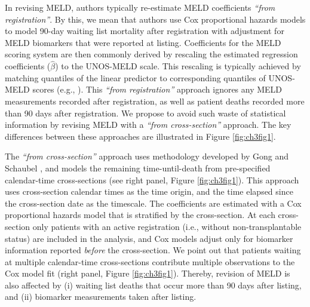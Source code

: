\documentclass[11pt,twoside,]{book}
\begin{document}
In revising MELD, authors typically re-estimate MELD coefficients \emph{``from
registration''}. By this, we mean that authors use Cox proportional hazards models
to model 90-day waiting list mortality after registration with adjustment
for MELD biomarkers that were reported at listing. Coefficients for the MELD scoring system are then commonly derived by rescaling the estimated regression coefficients (\(\widehat{\beta}\)) to the UNOS-MELD scale. This rescaling is typically achieved by matching quantiles of the linear predictor to corresponding quantiles of UNOS-MELD scores (e.g., \citep{leiseRevisedModelEndstage2011, goudsmitRefittingModelEndstage2020}).
This \emph{``from registration''} approach ignores any MELD measurements recorded after registration, as
well as patient deaths recorded more than 90 days after registration. We
propose to avoid such waste of statistical information by revising
MELD with a \emph{``from cross-section''} approach. The key differences between these
approaches are illustrated in Figure \ref{fig:ch3fig1}.

The \emph{``from cross-section''} approach uses methodology developed by Gong and Schaubel
\citep{gongPartlyConditionalEstimation2013}, and models the remaining
time-until-death from pre-specified calendar-time cross-sections (see
right panel, Figure \ref{fig:ch3fig1}). This approach uses cross-section calendar
times as the time origin, and the time elapsed since the cross-section date as
the timescale. The coefficients are estimated with a Cox proportional hazards model
that is stratified by the cross-section. At each cross-section only
patients with an active registration (i.e., without non-transplantable
status) are included in the analysis, and Cox models adjust only for
biomarker information reported \emph{before} the cross-section. We point out
that patients waiting at multiple calendar-time cross-sections
contribute multiple observations to the Cox model fit (right panel,
Figure \ref{fig:ch3fig1}). Thereby, revision of MELD is also affected by (i)
waiting list deaths that occur more than 90 days after listing, and (ii)
biomarker measurements taken after listing.

\vfill
\end{document}
